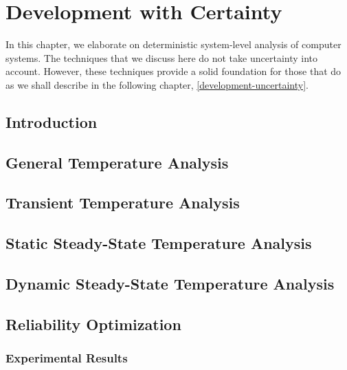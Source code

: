 \chapter{Development with Certainty}

In this chapter, we elaborate on deterministic system-level analysis of computer
systems. The techniques that we discuss here do not take uncertainty into
account. However, these techniques provide a solid foundation for those that do
as we shall describe in the following chapter, \cref{development-uncertainty}.

\section{Introduction}


\section{General Temperature Analysis}


\section{Transient Temperature Analysis}


\section{Static Steady-State Temperature Analysis}


\section{Dynamic Steady-State Temperature Analysis}


\section{Reliability Optimization}


\subsection{Experimental Results}

